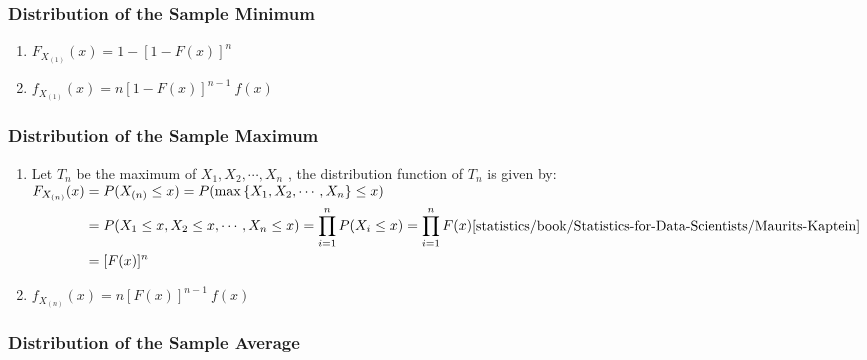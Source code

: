 \subsubsection{Distribution of the Sample Minimum}

\begin{enumerate}
    \item $F _{X_{(1)}}(x) = 1 - [1 - F(x)]^n$
    \hfill \cite{statistics/book/Statistics-for-Data-Scientists/Maurits-Kaptein}

    \item $f _{X_{(1)}} (x) = n [1 - F(x)]^{n-1}\ f (x)$
    \hfill \cite{statistics/book/Statistics-for-Data-Scientists/Maurits-Kaptein}
\end{enumerate}

\subsubsection{Distribution of the Sample Maximum}

\begin{enumerate}
    \item  Let $T_n$ be the maximum of $X_1 , X_2, \cdots , X _n$ , the distribution function of $T_n$ is given by:
    \hfill \cite{statistics/book/Statistics-for-Data-Scientists/Maurits-Kaptein}
    \\
    $
        \begin{aligned}
            F _{X_{(n)}} (x) 
            &= P (X_{(n)} \leq x) 
            = P (\max \dCurlyBrac{X_1, X_2, \cdots, X _n } \leq x) \\
            &= P (X_1 \leq x, X_2 \leq x, \cdots, X _n \leq x) 
            = \dprod ^n _{i=1} P (X _i \leq x)
            = \dprod ^n _{i=1} F(x) \\
            &= [F (x)]^n
        \end{aligned}
        \hfill \text{\cite{statistics/book/Statistics-for-Data-Scientists/Maurits-Kaptein}}
    $

    \item $f _{X_{(n)}} (x) = n [F (x)]^{n-1}\ f (x)$
    \hfill \cite{statistics/book/Statistics-for-Data-Scientists/Maurits-Kaptein}
\end{enumerate}



\subsubsection{Distribution of the Sample Average}

